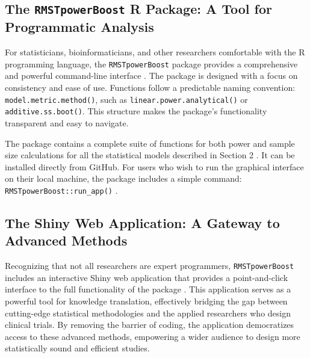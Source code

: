 \documentclass[article]{jss}
\begin{document}
\subsection{The \texttt{RMSTpowerBoost} R Package: A Tool for Programmatic Analysis}
For statisticians, bioinformaticians, and other researchers comfortable with the R programming language, the \texttt{RMSTpowerBoost} package provides a comprehensive and powerful command-line interface \cite{[1]}. The package is designed with a focus on consistency and ease of use. Functions follow a predictable naming convention: \texttt{model.metric.method()}, such as \texttt{linear.power.analytical()} or \texttt{additive.ss.boot()}. This structure makes the package's functionality transparent and easy to navigate.

The package contains a complete suite of functions for both power and sample size calculations for all the statistical models described in Section 2 \cite{[1]}. It can be installed directly from GitHub. For users who wish to run the graphical interface on their local machine, the package includes a simple command: \texttt{RMSTpowerBoost::run\_app()} \cite{[1, 1]}.

\subsection{The Shiny Web Application: A Gateway to Advanced Methods}
Recognizing that not all researchers are expert programmers, \texttt{RMSTpowerBoost} includes an interactive Shiny web application that provides a point-and-click interface to the full functionality of the package \cite{[1]}. This application serves as a powerful tool for knowledge translation, effectively bridging the gap between cutting-edge statistical methodologies and the applied researchers who design clinical trials. By removing the barrier of coding, the application democratizes access to these advanced methods, empowering a wider audience to design more statistically sound and efficient studies.
\end{document}
